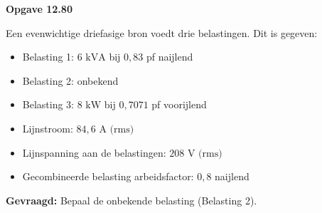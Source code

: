 \documentclass[a4paper,11pt]{article}
\begin{document}
\textbf{Opgave 12.80}

Een evenwichtige driefasige bron voedt drie belastingen. Dit is gegeven:
\begin{itemize}
    \item Belasting 1: $6 \text{ kVA}$ bij $0{,}83$ pf naijlend
    \item Belasting 2: onbekend
    \item Belasting 3: $8 \text{ kW}$ bij $0{,}7071$ pf voorijlend
    \item Lijnstroom: $84{,}6 \text{ A (rms)}$
    \item Lijnspanning aan de belastingen: $208 \text{ V (rms)}$
    \item Gecombineerde belasting arbeidsfactor: $0{,}8$ naijlend
\end{itemize}

\textbf{Gevraagd:} Bepaal de onbekende belasting (Belasting 2).
\end{document}
